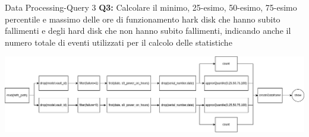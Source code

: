\documentclass[13pt,aspectratio=169,t,xcolor=table]{beamer}
\begin{document}
\begin{frame}{Data Processing-Query 3}
    \textbf{Q3:} Calcolare il minimo, 25-esimo, 50-esimo, 75-esimo percentile e massimo delle ore di funzionamento hark disk che hanno subito fallimenti e degli hard disk che non hanno subito fallimenti, indicando anche il numero totale di eventi utilizzati per il calcolo delle statistiche
    \begin{adjustbox}{margin=0cm 0cm 0cm 0.5cm, center}
        \includegraphics[width=1\textwidth]{res/query3_dag.png}
    \end{adjustbox}
\end{frame}

\end{document}
